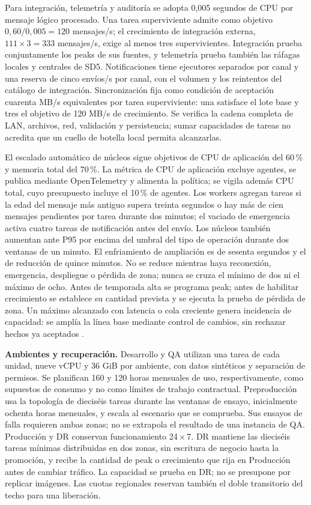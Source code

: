 Para integración, telemetría y auditoría se adopta 0,005 segundos de CPU por mensaje lógico procesado. Una tarea superviviente admite como objetivo $0,60/0,005=120$ mensajes/s; el crecimiento de integración externa, $111\times3=333$ mensajes/s, exige al menos tres supervivientes. Integración prueba conjuntamente los peaks de sus fuentes, y telemetría prueba también las ráfagas locales y centrales de SD5. Notificaciones tiene ejecutores separados por canal y una reserva de cinco envíos/s por canal, con el volumen y los reintentos del catálogo de integración. Sincronización fija como condición de aceptación cuarenta MB/s equivalentes por tarea superviviente: una satisface el lote base y tres el objetivo de 120 MB/s de crecimiento. Se verifica la cadena completa de LAN, archivos, red, validación y persistencia; sumar capacidades de tareas no acredita que un cuello de botella local permita alcanzarlas.

El escalado automático de núcleos sigue objetivos de CPU de aplicación del 60\,\% y memoria total del 70\,\%. La métrica de CPU de aplicación excluye agentes, se publica mediante OpenTelemetry y alimenta la política; se vigila además CPU total, cuyo presupuesto incluye el 10\,\% de agentes. Los workers agregan tareas si la edad del mensaje más antiguo supera treinta segundos o hay más de cien mensajes pendientes por tarea durante dos minutos; el vaciado de emergencia activa cuatro tareas de notificación antes del envío. Los núcleos también aumentan ante P95 por encima del umbral del tipo de operación durante dos ventanas de un minuto. El enfriamiento de ampliación es de sesenta segundos y el de reducción de quince minutos. No se reduce mientras haya reconexión, emergencia, despliegue o pérdida de zona; nunca se cruza el mínimo de dos ni el máximo de ocho. Antes de temporada alta se programa peak; antes de habilitar crecimiento se establece su cantidad prevista y se ejecuta la prueba de pérdida de zona. Un máximo alcanzado con latencia o cola creciente genera incidencia de capacidad: se amplía la línea base mediante control de cambios, sin rechazar hechos ya aceptados \parencite{c8-ecs-autoescalado}.

\textbf{Ambientes y recuperación.}
Desarrollo y QA utilizan una tarea de cada unidad, nueve vCPU y 36 GiB por ambiente, con datos sintéticos y separación de permisos. Se planifican 160 y 120 horas mensuales de uso, respectivamente, como supuestos de consumo y no como límites de trabajo contractual. Preproducción usa la topología de dieciséis tareas durante las ventanas de ensayo, inicialmente ochenta horas mensuales, y escala al escenario que se comprueba. Sus ensayos de falla requieren ambas zonas; no se extrapola el resultado de una instancia de QA. Producción y DR conservan funcionamiento 24\,$\times$\,7. DR mantiene las dieciséis tareas mínimas distribuidas en dos zonas, sin escritura de negocio hasta la promoción, y recibe la cantidad de peak o crecimiento que rija en Producción antes de cambiar tráfico. La capacidad se prueba en DR; no se presupone por replicar imágenes. Las cuotas regionales reservan también el doble transitorio del techo para una liberación.

